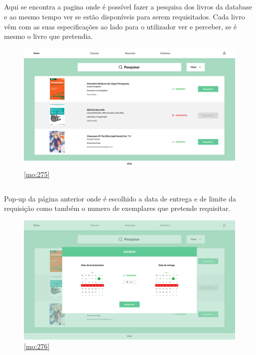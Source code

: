 \newpage

\subsection{}

Aqui se encontra a pagina onde é possível fazer a pesquisa dos livros da database e ao mesmo tempo ver se estão disponíveis para serem requisitados. Cada livro vêm com as suas especificações ao lado para o utilizador ver e perceber, se é mesmo o livro que pretendia. 

\begin{figure}[H]
	\centering
	\includegraphics[width=1\linewidth]{../Mockups/PNGs/Pesquisa dos livros.png}  %
	\caption{\ref{mo:275}}
	\label{fig:chap275}
\end{figure}

\newpage 

\subsection{}

Pop-up da página anterior onde é escolhido a data de entrega e de limite da requisição como também o numero de exemplares que pretende requisitar.

\begin{figure}[H]
	\centering
	\includegraphics[width=1\linewidth]{../Mockups/PNGs/Agendar Requisitar.png}  %
	\caption{\ref{mo:276}}
	\label{fig:chap276}
\end{figure}



